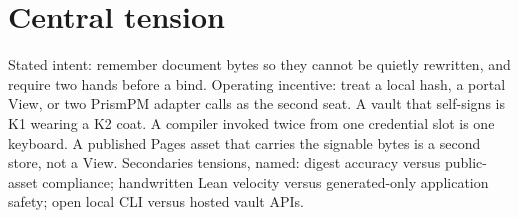 \section{Central tension}
Stated intent: remember document bytes so they cannot be quietly rewritten, and require two hands before a bind.
Operating incentive: treat a local hash, a portal View, or two PrismPM adapter calls as the second seat.
A vault that self-signs is K1 wearing a K2 coat. A compiler invoked twice from one credential slot is one keyboard. A published Pages asset that carries the signable bytes is a second store, not a View.
Secondaries tensions, named: digest accuracy versus public-asset compliance; handwritten Lean velocity versus generated-only application safety; open local CLI versus hosted vault APIs.
